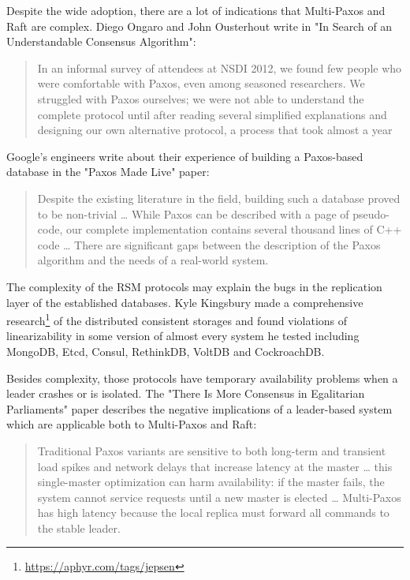 \documentclass[12pt]{article}
\theoremstyle{definition}
\begin{document}
Despite the wide adoption, there are a lot of indications that Multi-Paxos and Raft are complex. Diego Ongaro and John Ousterhout write in "In Search of an Understandable Consensus Algorithm"\cite{raft}:

\begin{quote}
In an informal survey of attendees at NSDI 2012, we found few people who were comfortable with Paxos, even among seasoned researchers. We struggled with Paxos ourselves; we were not able to understand the complete protocol until after reading several simplified explanations and designing our own alternative protocol, a process that took almost a year
\end{quote}

Google's engineers write about their experience of building a Paxos-based database in the "Paxos Made Live"\cite{chubby} paper:

\begin{quote}
Despite the existing literature in the field, building such a database proved to be non-trivial \ldots{} While Paxos can be described with a page of pseudo-code, our complete implementation contains several thousand lines of C++ code \ldots{} There are significant gaps between the description of the Paxos algorithm and the needs of a real-world system.
\end{quote}

The complexity of the RSM protocols may explain the bugs in the replication layer of the established databases. Kyle Kingsbury made a comprehensive research\footnote{\href{https://aphyr.com/tags/jepsen}{https://aphyr.com/tags/jepsen}} of the distributed consistent storages and found violations of linearizability in some version of almost every system he tested including MongoDB, Etcd, Consul, RethinkDB, VoltDB and CockroachDB.

Besides complexity, those protocols have temporary availability problems when a leader crashes or is isolated. The "There Is More Consensus in Egalitarian Parliaments" paper\cite{epaxos} describes the negative implications of a leader-based system which are applicable both to Multi-Paxos and Raft:

\begin{quote}
Traditional Paxos variants are sensitive to both long-term and transient load spikes and network delays that increase latency at the master \ldots{} this single-master optimization can harm availability: if the master fails, the system cannot service requests until a new master is elected \ldots{} Multi-Paxos has high latency because the local replica must forward all commands to the stable leader.
\end{quote}
\end{document}

